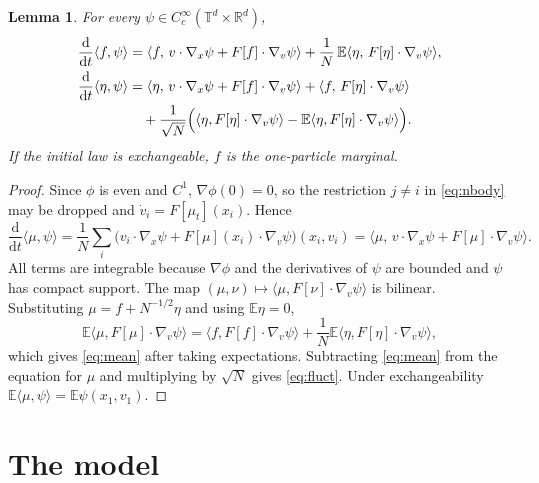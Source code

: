 \documentclass[11pt]{article}
\newcommand{\dd}{\mathrm{d}}
\newcommand{\E}{\mathbb{E}}
\newtheorem{lemma}[theorem]{Lemma}
\theoremstyle{remark}
\begin{document}
\begin{lemma}\label{lem:fluct}
For every $\psi\in C_c^\infty(\mathbb{T}^d\times\mathbb{R}^d)$,
\begin{align}
  \frac{\dd}{\dd t}\langle f,\psi\rangle
   &= \langle f,\, v\cdot\nabla_x\psi + F[f]\cdot\nabla_v\psi\rangle
     + \frac1N\,\E\langle\eta,\,F[\eta]\cdot\nabla_v\psi\rangle,
     \label{eq:mean}\\
  \frac{\dd}{\dd t}\langle\eta,\psi\rangle
   &= \langle\eta,\, v\cdot\nabla_x\psi + F[f]\cdot\nabla_v\psi\rangle
     + \langle f,\,F[\eta]\cdot\nabla_v\psi\rangle \notag\\
   &\quad + \frac{1}{\sqrt N}\Bigl(\langle\eta,F[\eta]\cdot\nabla_v\psi\rangle
       - \E\langle\eta,F[\eta]\cdot\nabla_v\psi\rangle\Bigr).
     \label{eq:fluct}
\end{align}
If the initial law is exchangeable, $f$ is the one-particle marginal.
\end{lemma}

\begin{proof}
Since $\phi$ is even and $C^1$, $\nabla\phi(0) = 0$, so the restriction
$j\ne i$ in \eqref{eq:nbody} may be dropped and
$\dot v_i = F[\mu_t](x_i)$. Hence
\[
  \frac{\dd}{\dd t}\langle\mu,\psi\rangle
  = \frac1N\sum_i\bigl(v_i\cdot\nabla_x\psi + F[\mu](x_i)\cdot\nabla_v\psi\bigr)(x_i,v_i)
  = \langle\mu,\,v\cdot\nabla_x\psi + F[\mu]\cdot\nabla_v\psi\rangle .
\]
All terms are integrable because $\nabla\phi$ and the derivatives of $\psi$
are bounded and $\psi$ has compact support. The map
$(\mu,\nu)\mapsto\langle\mu,F[\nu]\cdot\nabla_v\psi\rangle$ is bilinear.
Substituting $\mu = f + N^{-1/2}\eta$ and using $\E\eta = 0$,
\[
  \E\langle\mu,F[\mu]\cdot\nabla_v\psi\rangle
  = \langle f,F[f]\cdot\nabla_v\psi\rangle
    + \frac1N\E\langle\eta,F[\eta]\cdot\nabla_v\psi\rangle ,
\]
which gives \eqref{eq:mean} after taking expectations. Subtracting
\eqref{eq:mean} from the equation for $\mu$ and multiplying by $\sqrt N$ gives
\eqref{eq:fluct}. Under exchangeability
$\E\langle\mu,\psi\rangle = \E\psi(x_1,v_1)$.
\end{proof}

\section{The model}
\end{document}
